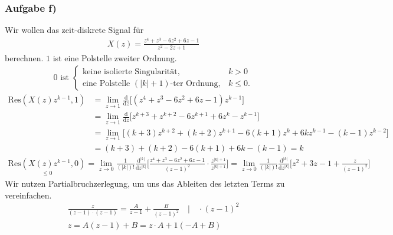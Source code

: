 \documentclass[11pt,a4paper,DIV=12]{scrartcl}
\begin{document}
\subsubsection{Aufgabe f)}
Wir wollen das zeit-diskrete Signal für
\begin{align}
	X(z)=\frac{z^4+z^3-6z^2+6z-1}{z^2-2z+1}
\end{align}
berechnen.
$1$ ist eine Polstelle zweiter Ordnung.
\begin{align}
	0\text{ ist }\begin{cases}
		\text{keine isolierte Singularität}, &k>0\\
		\text{eine Polstelle } (|k|+1)\text{-ter Ordnung}, &k\leq0.
	\end{cases}
\end{align}
\begin{align}
	\mathrm{Res}(X(z)z^{k-1},1)&=\lim\limits_{z\rightarrow1}\frac{\mathrm{d}}{\mathrm{d}z}\bigg [(z^4+z^3-6z^2+6z-1)z^{k-1}\bigg]\nonumber\\
	&=\lim\limits_{z\rightarrow1}\frac{\mathrm{d}}{\mathrm{d}z}\bigg[z^{k+3}+z^{k+2}-6z^{k+1}+6z^k-z^{k-1}\bigg]\nonumber\\
	&=\lim\limits_{z\rightarrow1}\bigg[(k+3)z^{k+2}+(k+2)z^{k+1}-6(k+1)z^{k}+6kz^{k-1}-(k-1)z^{k-2}\bigg ]\nonumber\\
	&=(k+3)+(k+2)-6(k+1)+6k-(k-1)=k
\end{align}
\begin{align}
	\underset{\leq0}{\mathrm{Res}(X(z)z^{k-1},0)}=\lim\limits_{z\rightarrow0}\frac{1}{(|k|)!}\frac{\mathrm{d}^{|k|}}{\mathrm{d}z^{|k|}}\Bigg[\frac{z^4+z^3-6z^2+6z-1}{(z-1)^2}\cdot\frac{z^{|k|+1}}{z^{|k|+1}}\Bigg]=\lim\limits_{z\rightarrow0}\frac{1}{(|k|)!}\frac{\mathrm{d}^{|k|}}{\mathrm{d}z^{|k|}}\Bigg[z^2+3z-1+\frac{z}{(z-1)^2}\Bigg]
\end{align}
Wir nutzen Partialbruchzerlegung, um uns das Ableiten des letzten Terms zu vereinfachen.
\begin{align}
	\frac{z}{(z-1)\cdot(z-1)}=\frac{A}{z-1}+\frac{B}{(z-1)^2}\quad\Bigg | \quad \cdot(z-1)^2\nonumber\\
	z=A(z-1)+B=z\cdot A+1(-A+B)
\end{align}
\end{document}
